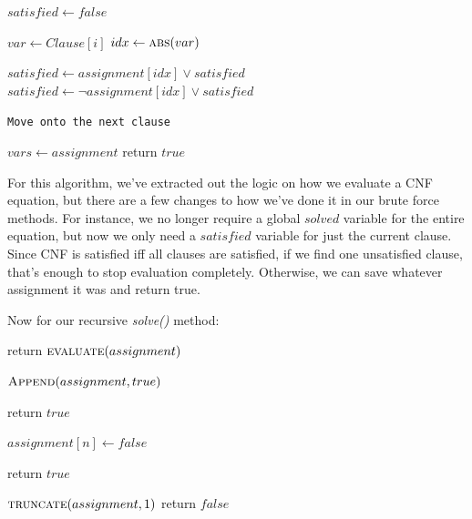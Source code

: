 \begin{algorithm}[H]
\caption{Evaluate CNF}\label{alg:6}
\begin{algorithmic}[1]

    \State $satisfied \gets false$

        \State $var \gets Clause[i]$
        \State $idx \gets \Call{abs}{var}$

            \State $satisfied \gets assignment[idx] \vee satisfied$
        \Else 
            \State $satisfied \gets \neg assignment[idx] \vee satisfied$
        \EndIf

            \State \texttt{Move onto the next clause}
        \EndIf
    \EndFor
    
    \EndIf
\EndFor
\State $vars \gets assignment$
\State return $true$
\EndProcedure
\end{algorithmic}
\end{algorithm}

For this algorithm, we've extracted out the logic on how we evaluate a CNF equation, 
but there are a few changes to how we've done it in our brute force methods. For instance,
we no longer require a global $solved$ variable for the entire equation, but now we only 
need a $satisfied$ variable for just the current clause. Since CNF is satisfied iff all 
clauses are satisfied, if we find one unsatisfied clause, that's enough to stop evaluation 
completely. Otherwise, we can save whatever assignment it was and return true.

Now for our recursive \textit{solve()} method:

\begin{algorithm}[H]
\caption{Recursive Backtracking}\label{alg:7}
\begin{algorithmic}[1]


    \State return $\Call{evaluate}{assignment}$
\EndIf

\State $\Call{Append}{assignment, true}$

    \State return $true$
\EndIf

\State $assignment[n] \gets false$

    \State return $true$
\EndIf

\State $\Call{truncate}{assignment, 1}$
\State return $false$

\EndProcedure
\end{algorithmic}
\end{algorithm}

